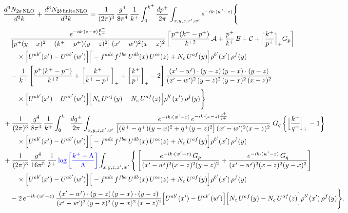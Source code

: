 \documentclass[10pt]{article}
\begin{document}
\begin{align}
&\frac{d^{3}N_{2a\,\rm NLO}}{d^{3}k}+\frac{d^{3}N_{2b\,\rm finite\,NLO}}{d^{3}k}=\frac{1}{(2\pi)^{3}}\,\frac{g^{4}}{8\pi^{4}}\,\frac{1}{k^{+}}\int_{0}^{k^{+}}\frac{dp^{+}}{2\pi}\int_{x,y,z,x',w'}e^{-ik\cdot(w'-z)}\Bigg\{\notag\\
&\quad\frac{e^{-ik\cdot(z-x)\frac{p^{+}}{k^{+}}}}{\big[p^{+}(y-x)^{2}+(k^{+}-p^{+})(y-z)^{2}\big]\,(x'-w')^{2}(x-z)^{2}}
\left[\frac{p^{+}(k^{+}-p^{+})}{k^{+2}}\,\mathcal{A}+\frac{p^{+}}{k^{+}}\,\mathcal{B}+\mathcal{C}+\Big[\frac{k^{+}}{p^{+}}\Big]_{+}G_{p}\right]\notag\\
&\qquad\times\Big[U^{ab'}(x')-U^{ab'}(w')\Big]\Big[-f^{adc}\,f^{fbe}\,U^{db}(x)\,U^{ce}(z)+N_{c}\,U^{af}(y)\Big]\rho^{b'}(x')\,\rho^{f}(y)\notag\\
&\quad-\frac{1}{k^{+}}\left[\frac{p^{+}(k^{+}-p^{+})}{k^{+2}}+\left[\frac{k^{+}}{k^{+}-p^{+}}\right]_{+}+\left[\frac{k^{+}}{p^{+}}\right]_{+}-2\right]\frac{(x'-w')\cdot(y-z)\,(y-x)\cdot(y-z)}{(x'-w')^{2}\,(y-z)^{2}\,(y-x)^{2}\,(x-z)^{2}}\notag\\
&\qquad\times\Big[U^{ab'}(x')-U^{ab'}(w')\Big]\Big[N_{c}\,U^{af}(y)-N_{c}\,U^{af}(z)\Big]\rho^{b'}(x')\,\rho^{f}(y)\Bigg\}\notag\\
&+\frac{1}{(2\pi)^{3}}\,\frac{g^{4}}{8\pi^{4}}\,\frac{1}{k^{+}}\int_{0}^{k^{+}}\frac{dq^{+}}{2\pi}\int_{x,y,z,x',w'}
\frac{e^{-ik\cdot(w'-x)}\,e^{-ik\cdot(x-z)\frac{q^{+}}{k^{+}}}}{\big[(k^{+}-q^{+})(y-x)^{2}+q^{+}(y-z)^{2}\big]\,(x'-w')^{2}(x-z)^{2}}\;G_{q}\left\{\Big[\frac{k^{+}}{q^{+}}\Big]_{+}-1\right\}\notag\\
&\qquad\times\Big[U^{ab'}(x')-U^{ab'}(w')\Big]\Big[-f^{adc}\,f^{fbe}\,U^{db}(x)\,U^{ce}(z)+N_{c}\,U^{af}(y)\Big]\rho^{b'}(x')\,\rho^{f}(y)\notag\\
&+\frac{1}{(2\pi)^{3}}\,\frac{g^{4}}{16\pi^{5}}\,\frac{1}{k^{+}}\,{\color{blue}\log\left[\frac{k^{+}-\Lambda}{\Lambda}\right]}\int_{x,y,z,x',w'}\Bigg\{\left[\frac{e^{-ik\cdot(w'-z)}\,G_{p}}{(x'-w')^{2}(x-z)^{2}(y-z)^{2}}+\frac{e^{-ik\cdot(w'-x)}\,G_{q}}{(x'-w')^{2}(x-z)^{2}(y-x)^{2}}\right]\notag\\
&\qquad\times\Big[U^{ab'}(x')-U^{ab'}(w')\Big]\Big[-f^{adc}\,f^{fbe}\,U^{db}(x)\,U^{ce}(z)+N_{c}\,U^{af}(y)\Big]\rho^{b'}(x')\,\rho^{f}(y)\notag\\
&\quad-2\,e^{-ik\cdot(w'-z)}\,\frac{(x'-w')\cdot(y-z)\,(y-x)\cdot(y-z)}{(x'-w')^{2}\,(y-z)^{2}\,(y-x)^{2}\,(x-z)^{2}}\Big[U^{ab'}(x')-U^{ab'}(w')\Big]\Big[N_{c}\,U^{af}(y)-N_{c}\,U^{af}(z)\Big]\rho^{b'}(x')\,\rho^{f}(y)\Bigg\}.
\end{align}
\end{document}
